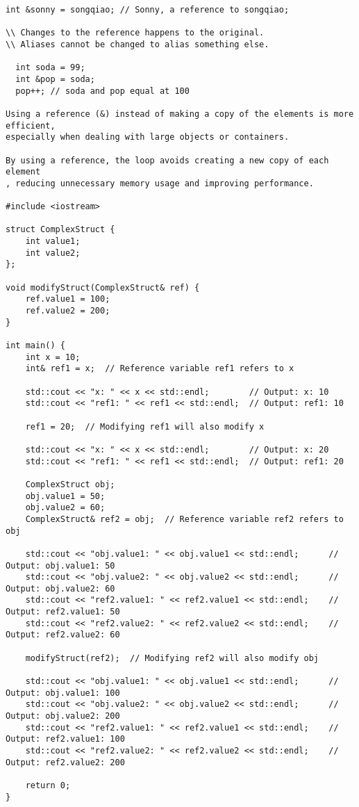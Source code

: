 \begin{verbatim}
int &sonny = songqiao; // Sonny, a reference to songqiao;

\\ Changes to the reference happens to the original.
\\ Aliases cannot be changed to alias something else.

  int soda = 99;
  int &pop = soda;
  pop++; // soda and pop equal at 100

Using a reference (&) instead of making a copy of the elements is more efficient,
especially when dealing with large objects or containers. 

By using a reference, the loop avoids creating a new copy of each element
, reducing unnecessary memory usage and improving performance.

#include <iostream>

struct ComplexStruct {
    int value1;
    int value2;
};

void modifyStruct(ComplexStruct& ref) {
    ref.value1 = 100;
    ref.value2 = 200;
}

int main() {
    int x = 10;
    int& ref1 = x;  // Reference variable ref1 refers to x

    std::cout << "x: " << x << std::endl;        // Output: x: 10
    std::cout << "ref1: " << ref1 << std::endl;  // Output: ref1: 10

    ref1 = 20;  // Modifying ref1 will also modify x

    std::cout << "x: " << x << std::endl;        // Output: x: 20
    std::cout << "ref1: " << ref1 << std::endl;  // Output: ref1: 20

    ComplexStruct obj;
    obj.value1 = 50;
    obj.value2 = 60;
    ComplexStruct& ref2 = obj;  // Reference variable ref2 refers to obj

    std::cout << "obj.value1: " << obj.value1 << std::endl;      // Output: obj.value1: 50
    std::cout << "obj.value2: " << obj.value2 << std::endl;      // Output: obj.value2: 60
    std::cout << "ref2.value1: " << ref2.value1 << std::endl;    // Output: ref2.value1: 50
    std::cout << "ref2.value2: " << ref2.value2 << std::endl;    // Output: ref2.value2: 60

    modifyStruct(ref2);  // Modifying ref2 will also modify obj

    std::cout << "obj.value1: " << obj.value1 << std::endl;      // Output: obj.value1: 100
    std::cout << "obj.value2: " << obj.value2 << std::endl;      // Output: obj.value2: 200
    std::cout << "ref2.value1: " << ref2.value1 << std::endl;    // Output: ref2.value1: 100
    std::cout << "ref2.value2: " << ref2.value2 << std::endl;    // Output: ref2.value2: 200

    return 0;
}

\end{verbatim}
